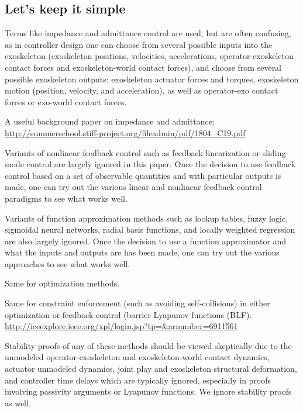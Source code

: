 \documentclass[letterpaper,12pt,fullpage]{article}
\begin{document}
\subsection{Let's keep it simple}

Terms like impedance and admittance control are used, but are often confusing,
as in controller design one can choose from several possible
inputs into the exoskeleton (exoskeleton positions,
velocities, accelerations, operator-exoskeleton contact forces and
exoskeleton-world contact forces), and choose from several possible exoskeleton
outputs: exoskeleton actuator forces and torques, exoskeleton
motion (position, velocity, and acceleration), as well as operator-exo
contact forces or exo-world contact forces.

A useful background paper on impedance and admittance:\\
\url{http://summerschool.stiff-project.org/fileadmin/pdf/1804_C19.pdf}

Variants of nonlinear feedback control such as feedback linearization or
sliding mode control are largely ignored in this paper.
Once the decision to use feedback control
based on a set of observable quantities and with particular outputs is made,
one can try out the various linear and nonlinear feedback control paradigms
to see what works well.

Variants of function approximation methods such as lookup tables, fuzzy logic,
sigmoidal neural networks, radial basis functions, and locally weighted regression
are also largely ignored. Once the decision to use a function approximator
and what the inputs and outputs are has been made, one can try out the various
approaches to see what works well.

Same for optimization methods.

Same for constraint enforcement (such as avoiding self-collisions)
in either optimization or feedback control (barrier
Lyapunov functions (BLF).\\
\url{http://ieeexplore.ieee.org/xpl/login.jsp?tp=&arnumber=6911561}

Stability proofs of any of these methods should be viewed skeptically due
to the unmodeled operator-exoskeleton and exoskeleton-world contact dynamics, 
actuator unmodeled dynamics, joint play and exoskeleton
structural deformation, and controller
time delays which are typically ignored, especially in proofs involving
passivity arguments or Lyapunov functions.
We ignore stability proofs as well.

\end{document}
